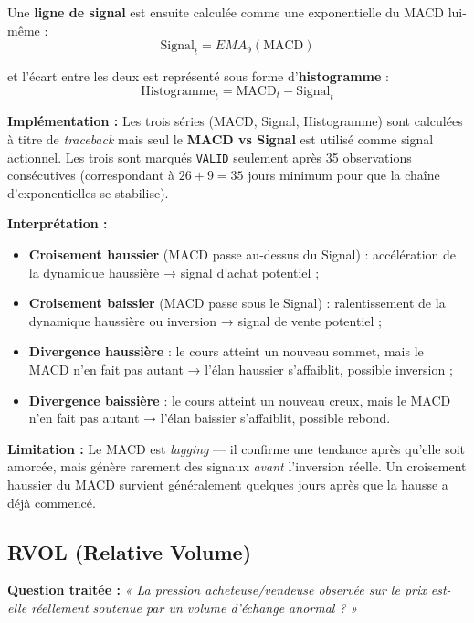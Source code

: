 \documentclass{rapportENSIAS} %
\begin{document}
\vspace{0.2cm}
\noindent
Une \textbf{ligne de signal} est ensuite calculée comme une exponentielle du MACD lui-même :
\[
\text{Signal}_t = EMA_{9}(\text{MACD})
\]

\noindent
et l'écart entre les deux est représenté sous forme d'\textbf{histogramme} :
\[
\text{Histogramme}_t = \text{MACD}_t - \text{Signal}_t
\]

\vspace{0.2cm}
\noindent
\textbf{Implémentation :} Les trois séries (MACD, Signal, Histogramme) sont calculées à titre de \textit{traceback} mais seul le \textbf{MACD vs Signal} est utilisé comme signal actionnel. Les trois sont marqués \texttt{VALID} seulement après 35 observations consécutives (correspondant à $26 + 9 = 35$ jours minimum pour que la chaîne d'exponentielles se stabilise).

\vspace{0.2cm}
\noindent
\textbf{Interprétation :}
\begin{itemize}
    \item \textbf{Croisement haussier} (MACD passe au-dessus du Signal) : accélération de la dynamique haussière → signal d'achat potentiel ;
    \item \textbf{Croisement baissier} (MACD passe sous le Signal) : ralentissement de la dynamique haussière ou inversion → signal de vente potentiel ;
    \item \textbf{Divergence haussière} : le cours atteint un nouveau sommet, mais le MACD n'en fait pas autant → l'élan haussier s'affaiblit, possible inversion ;
    \item \textbf{Divergence baissière} : le cours atteint un nouveau creux, mais le MACD n'en fait pas autant → l'élan baissier s'affaiblit, possible rebond.
\end{itemize}

\noindent
\textbf{Limitation :} Le MACD est \textit{lagging} — il confirme une tendance après qu'elle soit amorcée, mais génère rarement des signaux \textit{avant} l'inversion réelle. Un croisement haussier du MACD survient généralement quelques jours après que la hausse a déjà commencé.

\subsection{RVOL (Relative Volume)}

\noindent
\textbf{Question traitée :} \textit{« La pression acheteuse/vendeuse observée sur le prix est-elle réellement soutenue par un volume d'échange anormal ? »}
\end{document}
